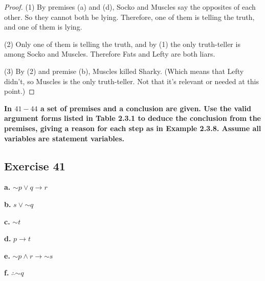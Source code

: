 \documentclass[14pt]{extarticle}
\begin{document}
\begin{proof}
    (1) By premises (a) and (d), Socko and Muscles say the opposites of each other. So they cannot both be lying. Therefore, one of them is telling the truth, and one of them is lying.

    (2) Only one of them is telling the truth, and by (1) the only truth-teller is among Socko and Muscles. Therefore Fats and Lefty are both liars.

    (3) By (2) and premise (b), Muscles killed Sharky. (Which means that Lefty didn't, so Muscles is the only truth-teller. Not that it's relevant or needed at this point.)
\end{proof}

{\bf \color{cyan} In $41-44$ a set of premises and a conclusion are given. Use the valid argument forms listed in Table 2.3.1 to deduce the conclusion from the premises, giving a reason for each step as in Example 2.3.8. Assume all variables are statement variables.}

\subsection{Exercise 41}
{\bf a.} ${\sim p} \vee q \to r$

{\bf b.} $s \vee {\sim q}$

{\bf c.} ${\sim t}$

{\bf d.} $p \to t$

{\bf e.} ${\sim p} \wedge r \to {\sim s}$

{\bf f.} $\therefore {\sim q}$
\end{document}
